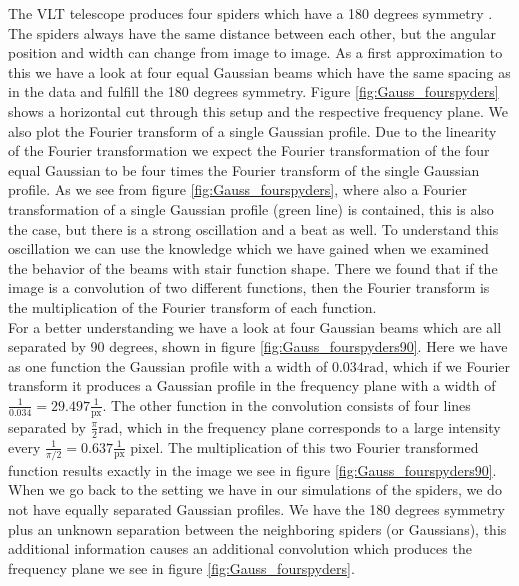 The VLT telescope produces four spiders which have a 180 degrees symmetry \cite{ESOmanual}. The spiders always have the same distance between each other, but the angular position and width can change from image to image. As a first approximation to this we have a look at four equal Gaussian beams which have the same spacing as in the data and fulfill the 180 degrees symmetry. Figure \ref{fig:Gauss_fourspyders} shows a horizontal cut through this setup and the respective frequency plane. We also plot the Fourier transform of a single Gaussian profile. Due to the linearity of the Fourier transformation we expect the Fourier transformation of the four equal Gaussian to be four times the Fourier transform of the single Gaussian profile. As we see from figure \ref{fig:Gauss_fourspyders}, where also a Fourier transformation of a single Gaussian profile (green line) is contained, this is also the case, but there is a strong oscillation and a beat as well. To understand this oscillation we can use the knowledge which we have gained when we examined the behavior of the beams with stair function shape. There we found that if the image is a convolution of two different functions, then the Fourier transform is the multiplication of the Fourier transform of each function. \\
For a better understanding we have a look at four Gaussian beams which are all separated by 90 degrees, shown in figure \ref{fig:Gauss_fourspyders90}. Here we have as one function the Gaussian profile with a width of $0.034 \mathrm{rad}$,  which if we Fourier transform it produces a Gaussian profile in the frequency plane with a width of $\frac{1}{0.034} = 29.497 \frac{1}{\mathrm{px}}$. The other function in the convolution consists of four lines separated by $\frac{\pi}{2} \mathrm{rad}$, which in the frequency plane corresponds to a large intensity every $\frac{1}{\pi/2} = 0.637 \frac{1}{\mathrm{px}}$ pixel. The multiplication of this two Fourier transformed function results exactly in the image we see in figure \ref{fig:Gauss_fourspyders90}. \\
When we go back to the setting we have in our simulations of the spiders, we do not have equally separated Gaussian profiles. We have the 180 degrees symmetry plus an unknown separation between the neighboring spiders (or Gaussians), this additional information causes an additional convolution which produces the frequency plane we see in figure \ref{fig:Gauss_fourspyders}. 
